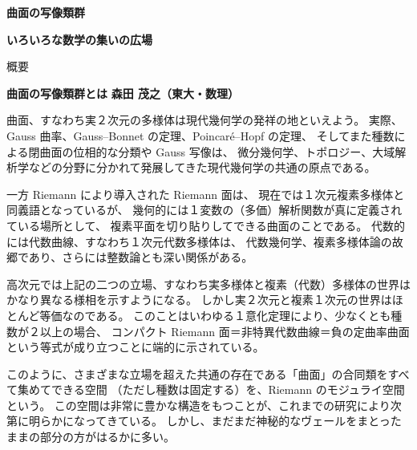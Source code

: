 \documentclass[uplatex,dvipdfmx]{jlreq}
\begin{document}
\begin{center}
  {\Huge\bfseries 曲面の写像類群}
\end{center}

\vspace{10pt}

\begin{center}
  {\Large\bfseries いろいろな数学の集いの広場}
\end{center}

\vspace{10pt}

\begin{center}
  {\large 概要}
\end{center}

\newpage

\noindent
{\large\bfseries 曲面の写像類群とは}
\hfill
{\large\bfseries 森田 茂之（東大・数理）}

\medskip

曲面、すなわち実２次元の多様体は現代幾何学の発祥の地といえよう。
実際、Gauss 曲率、Gauss--Bonnet の定理、Poincaré--Hopf の定理、
そしてまた種数による閉曲面の位相的な分類や Gauss 写像は、
微分幾何学、トポロジー、大域解析学などの分野に分かれて発展してきた現代幾何学の共通の原点である。

一方 Riemann により導入された Riemann 面は、
現在では１次元複素多様体と同義語となっているが、
幾何的には１変数の（多価）解析関数が真に定義されている場所として、
複素平面を切り貼りしてできる曲面のことである。
代数的には代数曲線、すなわち１次元代数多様体は、
代数幾何学、複素多様体論の故郷であり、さらには整数論とも深い関係がある。

高次元では上記の二つの立場、すなわち実多様体と複素（代数）多様体の世界は
かなり異なる様相を示すようになる。
しかし実２次元と複素１次元の世界はほとんど等価なのである。
このことはいわゆる１意化定理により、少なくとも種数が２以上の場合、
コンパクト Riemann 面＝非特異代数曲線＝負の定曲率曲面という等式が成り立つことに端的に示されている。

このように、さまざまな立場を超えた共通の存在である「曲面」の合同類をすべて集めてできる空間
（ただし種数は固定する）を、Riemann のモジュライ空間という。
この空間は非常に豊かな構造をもつことが、これまでの研究により次第に明らかになってきている。
しかし、まだまだ神秘的なヴェールをまとったままの部分の方がはるかに多い。
\end{document}
